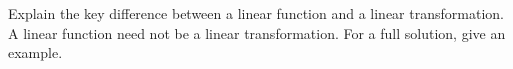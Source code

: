 {Explain the key difference between a linear function and a linear transformation.
}
{A linear function need not be a linear transformation.    For a full solution, give an example.
}